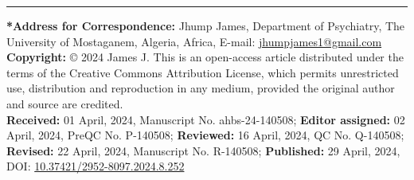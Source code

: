 \documentclass{article}
\begin{document}
\vfill
\noindent
\hspace*{0pt}\color{color_100238}\rule{\textwidth}{1pt}
\par\vspace{0.3cm} %

\fontsize{8.5}{10.2}\selectfont
\color{color_100238}\textbf{*Address for Correspondence:} 
\color{color_29791}Jhump James, Department of Psychiatry, The University of Mostaganem, Algeria, Africa, 
E-mail: \href{mailto:jhumpjames1@gmail.com}{jhumpjames1@gmail.com} \\

\color{color_100238}\textbf{Copyright:} 
\color{color_29791}© 2024 James J. This is an open-access article distributed under the terms of the Creative Commons Attribution License, which permits unrestricted use, distribution and reproduction in any medium, provided the original author and source are credited. \\

\vspace{0.1cm}
\color{color_29791}\textbf{Received:} 01 April, 2024, Manuscript No. ahbs-24-140508; 
\textbf{Editor assigned:} 02 April, 2024, PreQC No. P-140508; 
\textbf{Reviewed:} 16 April, 2024, QC No. Q-140508; 
\textbf{Revised:} 22 April, 2024, Manuscript No. R-140508; 
\textbf{Published:} 29 April, 2024, 
DOI: \href{https://doi.org/10.37421/2952-8097.2024.8.252}{10.37421/2952-8097.2024.8.252}
\end{document}
